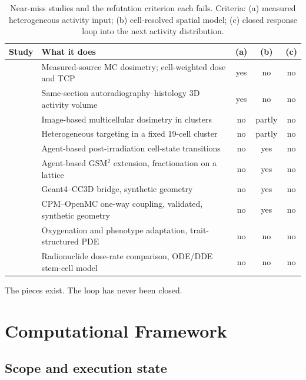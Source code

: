 \documentclass[11pt]{article}
\begin{document}
\begin{table}[t]
\centering
\caption{Near-miss studies and the refutation criterion each fails. Criteria: (a)
measured heterogeneous activity input; (b) cell-resolved spatial model; (c) closed
response loop into the next activity distribution.}
\label{tab:nearmiss}
\small
\begin{tabularx}{\linewidth}{@{}l X c c c@{}}
\toprule
Study & What it does & (a) & (b) & (c) \\
\midrule
\cite{mellhammar2023} & Measured-source MC dosimetry; cell-weighted dose and TCP &
yes & no & no \\
\cite{sahota2025} & Same-section autoradiography--histology 3D activity volume &
yes & no & no \\
\cite{tamborino2025} & Image-based multicellular dosimetry in clusters &
no & partly & no \\
\cite{larouze2023} & Heterogeneous targeting in a fixed 19-cell cluster &
no & partly & no \\
\cite{liu2025pbt} & Agent-based post-irradiation cell-state transitions &
no & yes & no \\
\cite{cordoni2026} & Agent-based GSM$^2$ extension, fractionation on a lattice &
no & yes & no \\
\cite{liu2021radcell} & Geant4--CC3D bridge, synthetic geometry &
no & yes & no \\
\cite{kinder2026biofilm} & CPM--OpenMC one-way coupling, validated, synthetic geometry &
no & yes & no \\
\cite{albanese2026} & Oxygenation and phenotype adaptation, trait-structured PDE &
no & no & no \\
\cite{mvogo2026} & Radionuclide dose-rate comparison, ODE/DDE stem-cell model &
no & no & no \\
\bottomrule
\end{tabularx}
\end{table}

The pieces exist. The loop has never been closed.

\section{Computational Framework}\label{sec:framework}

\subsection{Scope and execution state}
\end{document}
